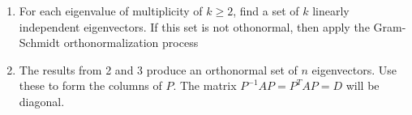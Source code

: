 \documentclass[15pt]{article}
\begin{document}
\begin{flushleft}
\begin{itemize}
\begin{enumerate}
                                normalize it.)
                        \item For each eigenvalue of multiplicity of $k \geq 2$,
                                find a set of $k$ linearly independent 
                                eigenvectors. If this set is not othonormal,
                                then apply the Gram-Schmidt orthonormalization
                                process
                        \item  The results from 2 and 3 produce an orthonormal
                                set of $n$ eigenvectors. Use these to form the
                                columns of $P$. The matrix $P^{-1}AP = P^TAP =
                                D$ will be diagonal.
                \end{enumerate}
\end{itemize}

\end{flushleft}
\end{document}

